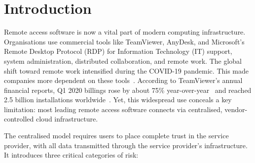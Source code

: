 \documentclass[12pt,a4paper,oneside]{report}
\begin{document}
\tableofcontents
\listoffigures
\listoftables

\chapter{Introduction}
\label{ch:introduction}

Remote access software is now a vital part of modern computing infrastructure. Organisations use commercial tools like TeamViewer, AnyDesk, and Microsoft's Remote Desktop Protocol (RDP) for Information Technology (IT) support, system administration, distributed collaboration, and remote work. The global shift toward remote work intensified during the COVID-19 pandemic. This made companies more dependent on these tools~\cite{blsremote}. According to TeamViewer's annual financial reports, Q1 2020 billings rose by about 75\% year-over-year~\cite{teamviewer2020q1} and reached 2.5 billion installations worldwide~\cite{teamviewer2020anniversary}. Yet, this widespread use conceals a key limitation: most leading remote access software connects via centralised, vendor-controlled cloud infrastructure.

The centralised model requires users to place complete trust in the service provider, with all data transmitted through the service provider's infrastructure. It introduces three critical categories of risk:
\end{document}
